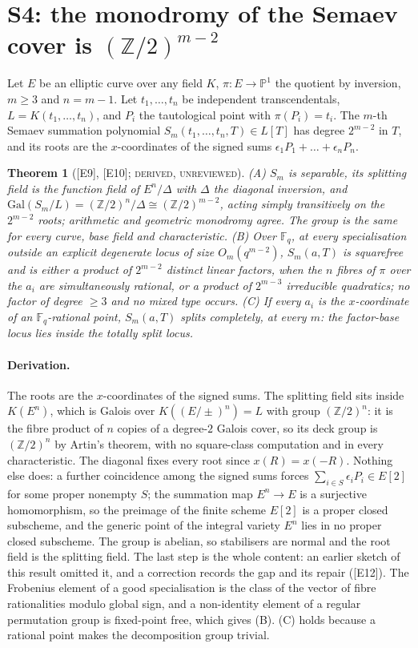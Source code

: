 \documentclass[10pt,a4paper]{article}
\newcommand{\FF}{\mathbb{F}}
\newcommand{\ZZ}{\mathbb{Z}}
\newcommand{\ev}[1]{\textup{[#1]}}
\newtheorem{theorem}{Theorem}
\theoremstyle{definition}
\theoremstyle{remark}
\begin{document}
\section{S4: the monodromy of the Semaev cover is $(\ZZ/2)^{m-2}$}
\label{sec:s4}

Let $E$ be an elliptic curve over any field $K$, $\pi:E\to\mathbb{P}^1$ the
quotient by inversion, $m\ge3$ and $n=m-1$. Let $t_1,\dots,t_n$ be independent
transcendentals, $L=K(t_1,\dots,t_n)$, and $P_i$ the tautological point with
$\pi(P_i)=t_i$. The $m$-th Semaev summation polynomial $S_m(t_1,\dots,t_n,T)\in L[T]$
has degree $2^{m-2}$ in $T$, and its roots are the $x$-coordinates of the signed
sums $\epsilon_1P_1+\dots+\epsilon_nP_n$.

\begin{theorem}[\ev{E9}, \ev{E10}; \textsc{derived, unreviewed}]
\label{thm:mono}
\emph{(A)} $S_m$ is separable, its splitting field is the function field of
$E^{n}/\Delta$ with $\Delta$ the diagonal inversion, and
$\mathrm{Gal}(S_m/L)=(\ZZ/2)^{n}/\Delta\cong(\ZZ/2)^{m-2}$, acting simply
transitively on the $2^{m-2}$ roots; arithmetic and geometric monodromy agree. The
group is the same for every curve, base field and characteristic.
\emph{(B)} Over $\FF_q$, at every specialisation outside an explicit degenerate
locus of size $O_m(q^{m-2})$, $S_m(a,T)$ is squarefree and is either a product of
$2^{m-2}$ distinct linear factors, when the $n$ fibres of $\pi$ over the $a_i$ are
simultaneously rational, or a product of $2^{m-3}$ irreducible quadratics; no
factor of degree $\ge3$ and no mixed type occurs.
\emph{(C)} If every $a_i$ is the $x$-coordinate of an $\FF_q$-rational point, $S_m(a,T)$
splits completely, at every $m$: the factor-base locus lies inside the totally
split locus.
\end{theorem}

\paragraph{Derivation.}
The roots are the $x$-coordinates of the signed sums. The splitting field sits
inside $K(E^{n})$, which is Galois over $K((E/\pm)^{n})=L$ with group $(\ZZ/2)^{n}$:
it is the fibre product of $n$ copies of a degree-$2$ Galois cover, so its deck
group is $(\ZZ/2)^{n}$ by Artin's theorem, with no square-class computation and
in every characteristic. The diagonal fixes every root since $x(R)=x(-R)$. Nothing
else does: a further coincidence among the signed sums forces
$\sum_{i\in S}\epsilon_iP_i\in E[2]$ for some proper nonempty $S$; the summation map
$E^{n}\to E$ is a surjective homomorphism, so the preimage of the finite scheme
$E[2]$ is a proper closed subscheme, and the generic point of the integral variety
$E^{n}$ lies in no proper closed subscheme. The group is abelian, so stabilisers
are normal and the root field is the splitting field. The last step is the whole
content: an earlier sketch of this result omitted it, and a correction records the
gap and its repair (\ev{E12}). The Frobenius element of a good specialisation is the
class of the vector of fibre rationalities modulo global sign, and a non-identity
element of a regular permutation group is fixed-point free, which gives (B). (C)
holds because a rational point makes the decomposition group trivial.
\end{document}
